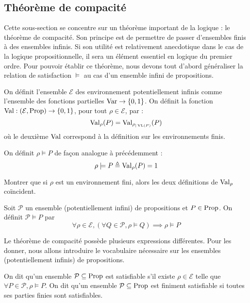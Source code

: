 \subsection{Théorème de compacité}

Cette sous-section se concentre sur un théorème important de la logique : le
théorème de compacité. Son principe est de permettre de passer d'ensembles finis
à des ensembles infinis. Si son utilité est relativement anecdotique dans le cas
de la logique propositionnelle, il sera un élément essentiel en logique du
premier ordre. Pour pouvoir établir ce théorème, nous devons tout d'abord
généraliser la relation de satisfaction $\vDash$ au cas d'un ensemble infini de
propositions.

\begin{definition}
  On définit l'ensemble $\mathcal E$ des environnement potentiellement infinis
  comme l'ensemble des fonctions partielles $\operatorname{Var} \to \{0,1\}$. On définit la
  fonction $\operatorname{Val} : (\mathcal E,\operatorname{Prop})\to \{0,1\}$, pour tout
  $\rho\in\mathcal E$, par :
  \[\operatorname{Val}_\rho(P) = \operatorname{Val}_{\rho_{|\operatorname{VL}(P)}}(P)\]
  où le deuxième $\operatorname{Val}$ correspond à la définition sur les environnements finis.

  On définit $\rho\models P$ de façon analogue à précédemment :
  \[\rho\models P \triangleq \operatorname{Val}_\rho(P) = 1\]
\end{definition}

\begin{exercise}
  Montrer que si $\rho$ est un environnement fini, alors les deux définitions de
  $\operatorname{Val}_\rho$ coïncident.
\end{exercise}

\begin{definition}
  Soit $\mathcal P$ un ensemble (potentiellement infini) de propositions et
  $P\in\operatorname{Prop}$. On définit $\mathcal P\vDash P$ par
  \[\forall \rho\in\mathcal E, (\forall Q \in\mathcal P, \rho\models Q)
  \implies \rho\models P\]
\end{definition}

Le théorème de compacité possède plusieurs expressions différentes. Pour les
donner, nous allons introduire le vocabulaire nécessaire sur les ensembles
(potentiellement infinis) de propositions.

\begin{definition}[Satisfiabilité]
  On dit qu'un ensemble $\mathcal P\subseteq\operatorname{Prop}$ est satisfiable s'il existe
  $\rho\in\mathcal E$ telle que $\forall P\in\mathcal P, \rho\models P$. On dit
  qu'un ensemble $\mathcal P\subseteq\operatorname{Prop}$ est finiment satisfiable si toutes
  ses parties finies sont satisfiables.
\end{definition}

